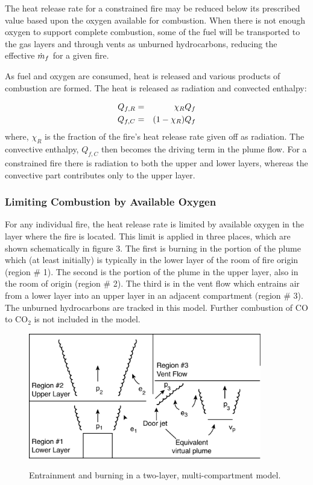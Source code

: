 The heat release rate for a constrained fire may be reduced below its prescribed value based upon the oxygen available for combustion.  When there is not enough oxygen to support complete combustion, some of the fuel will be transported to the gas layers and through vents as unburned hydrocarbons, reducing the effective $\dot{m}_f$ for a given fire.

As fuel and oxygen are consumed, heat is released and various products of combustion are formed. The heat is released as radiation and convected enthalpy:

\begin{eqnarray} Q_{f,R} &=& \chi_R Q_f \\
Q_{f,C} &=& { \left( {1-\chi_R} \right) } Q_f
\end{eqnarray}
where, $\chi_R$ is the fraction  of the fire's heat release rate given off as radiation.  The convective
enthalpy, $Q_{f,C}$ then becomes the driving term in the plume flow.  For a constrained fire there is
radiation to both the upper and lower layers, whereas the convective part contributes only to the
upper layer.

\subsubsection{Limiting Combustion by Available Oxygen \label{sec:Oxygen_Limit}}

For any individual fire, the heat release rate is limited by available oxygen in the layer where the fire is located. This limit is applied in three
places, which are shown schematically in figure 3. The first is burning in the portion of the
plume which (at least initially) is typically in the lower layer of the room of fire origin (region \# 1).  The second is the portion of the plume in the upper layer, also in the room of origin (region \# 2).  The third is in the
vent flow which entrains air from a lower layer into an upper layer in an adjacent compartment
(region \# 3). The unburned hydrocarbons are tracked in this model.  Further combustion of CO to
$\mathrm{CO_2}$ is not included in the model.

\begin{figure}[h]
\begin{center}
\includegraphics[width=4.0in]{FIGURES/Theory/Fire_entrain}\\
\end{center}
\caption{Entrainment and burning in a two-layer, multi-compartment model.}
 \label{fig:Burning_Regions}
\end{figure}

